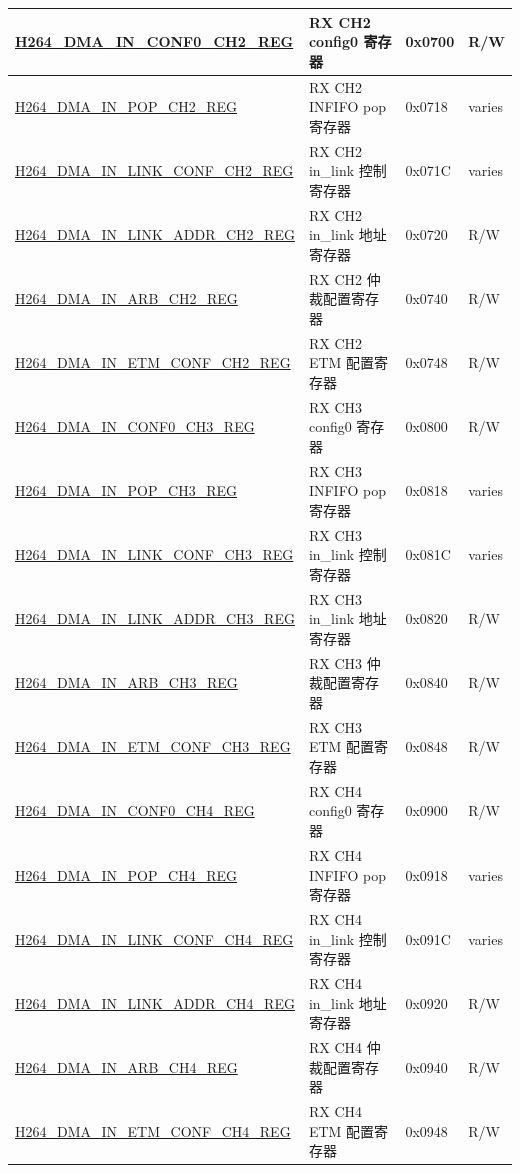 \begin{longtable}{ | p{7.5cm} | p{5.7cm} | p{1.2cm} | p{1cm} | }
    \hyperref[regdesc:H264DMAINCONF0CH2REG]{H264\_DMA\_IN\_CONF0\_CH2\_REG} & RX CH2 config0 寄存器 & 0x0700 & R/W \\ \hline
    \hyperref[regdesc:H264DMAINPOPCH2REG]{H264\_DMA\_IN\_POP\_CH2\_REG} & RX CH2 INFIFO pop 寄存器 & 0x0718 & varies \\ \hline
    \hyperref[regdesc:H264DMAINLINKCONFCH2REG]{H264\_DMA\_IN\_LINK\_CONF\_CH2\_REG} & RX CH2 in\_link 控制寄存器 & 0x071C & varies \\ \hline
    \hyperref[regdesc:H264DMAINLINKADDRCH2REG]{H264\_DMA\_IN\_LINK\_ADDR\_CH2\_REG} & RX CH2 in\_link 地址寄存器 & 0x0720 & R/W \\ \hline
    \hyperref[regdesc:H264DMAINARBCH2REG]{H264\_DMA\_IN\_ARB\_CH2\_REG} & RX CH2 仲裁配置寄存器 & 0x0740 & R/W \\ \hline
    \hyperref[regdesc:H264DMAINETMCONFCH2REG]{H264\_DMA\_IN\_ETM\_CONF\_CH2\_REG} & RX CH2 ETM 配置寄存器 & 0x0748 & R/W \\ \hline

    \hyperref[regdesc:H264DMAINCONF0CH3REG]{H264\_DMA\_IN\_CONF0\_CH3\_REG} & RX CH3 config0 寄存器 & 0x0800 & R/W \\ \hline
    \hyperref[regdesc:H264DMAINPOPCH3REG]{H264\_DMA\_IN\_POP\_CH3\_REG} & RX CH3 INFIFO pop 寄存器 & 0x0818 & varies \\ \hline
    \hyperref[regdesc:H264DMAINLINKCONFCH3REG]{H264\_DMA\_IN\_LINK\_CONF\_CH3\_REG} & RX CH3 in\_link 控制寄存器 & 0x081C & varies \\ \hline
    \hyperref[regdesc:H264DMAINLINKADDRCH3REG]{H264\_DMA\_IN\_LINK\_ADDR\_CH3\_REG} & RX CH3 in\_link 地址寄存器 & 0x0820 & R/W \\ \hline
    \hyperref[regdesc:H264DMAINARBCH3REG]{H264\_DMA\_IN\_ARB\_CH3\_REG} & RX CH3 仲裁配置寄存器 & 0x0840 & R/W \\ \hline
    \hyperref[regdesc:H264DMAINETMCONFCH3REG]{H264\_DMA\_IN\_ETM\_CONF\_CH3\_REG} & RX CH3 ETM 配置寄存器 & 0x0848 & R/W \\ \hline

    \hyperref[regdesc:H264DMAINCONF0CH4REG]{H264\_DMA\_IN\_CONF0\_CH4\_REG} & RX CH4 config0 寄存器 & 0x0900 & R/W \\ \hline
    \hyperref[regdesc:H264DMAINPOPCH4REG]{H264\_DMA\_IN\_POP\_CH4\_REG} & RX CH4 INFIFO pop 寄存器 & 0x0918 & varies \\ \hline
    \hyperref[regdesc:H264DMAINLINKCONFCH4REG]{H264\_DMA\_IN\_LINK\_CONF\_CH4\_REG} & RX CH4 in\_link 控制寄存器 & 0x091C & varies \\ \hline
    \hyperref[regdesc:H264DMAINLINKADDRCH4REG]{H264\_DMA\_IN\_LINK\_ADDR\_CH4\_REG} & RX CH4 in\_link 地址寄存器 & 0x0920 & R/W \\ \hline
    \hyperref[regdesc:H264DMAINARBCH4REG]{H264\_DMA\_IN\_ARB\_CH4\_REG} & RX CH4 仲裁配置寄存器 & 0x0940 & R/W \\ \hline
    \hyperref[regdesc:H264DMAINETMCONFCH4REG]{H264\_DMA\_IN\_ETM\_CONF\_CH4\_REG} & RX CH4 ETM 配置寄存器 & 0x0948 & R/W \\ \hline




\end{longtable}
